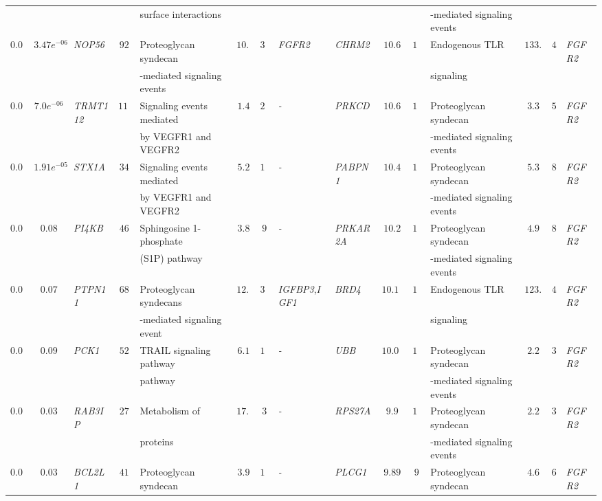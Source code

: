 \documentclass[10pt]{article}
\begin{document}
{\begin{landscape}
\begin{table}[!htbp]
{\begin{tabular}{c c l c l c c l |l c c l c c l}
&&&&  surface interactions &&&&&&& -mediated signaling events &&&\tabularnewline

$0.03$ & $3.47e^{-06}$ & \textit{NOP56} & $92$ & Proteoglycan syndecan & $10.1$ & $36$&\textit{FGFR2} & \textit{CHRM2} & $10.6$ & $12$ & Endogenous TLR  & $133.9$ & $4$ & \textit{FGFR2} \tabularnewline

&&&& -mediated signaling events &&&&&&& signaling &&&\tabularnewline

$0.07$ & $7.0e^{-06}$ & \textit{TRMT112} & $117$ & Signaling events mediated & $1.4$ & $20$&\textit{-} & \textit{PRKCD} & $10.6$ & $12$ & Proteoglycan syndecan & $3.3$ & $5$ & \textit{FGFR2} \tabularnewline

&&&& by VEGFR1 and VEGFR2 &&&&&&& -mediated signaling events &&&\tabularnewline

$0.09$ & $1.91e^{-05}$ & \textit{STX1A} & $34$ & Signaling events mediated & $5.2$ & $10$&\textit{-} & \textit{PABPN1} & $10.4$ & $13$ & Proteoglycan syndecan & $5.3$ & $8$ & \textit{FGFR2} \tabularnewline

&&&& by VEGFR1 and VEGFR2  &&&&&&& -mediated signaling events &&&\tabularnewline


$0.03$ & $0.08$ & \textit{PI4KB} & $46$ & Sphingosine 1-phosphate & $3.8$ & $9$&\textit{-} & \textit{PRKAR2A} & $10.2$ & $13$ & Proteoglycan syndecan & $4.9$ & $8$ & \textit{FGFR2} \tabularnewline

&&&&  (S1P) pathway &&&&&&& -mediated signaling events &&& \tabularnewline

$0.05$ & $0.07$ & \textit{PTPN11} & $68$ & Proteoglycan syndecans & $12.8$ & $38$&\textit{IGFBP3},\textit{IGF1} & \textit{BRD4} & $10.138$ & $12$ & Endogenous TLR  & $123.6$ & $4$ & \textit{FGFR2} \tabularnewline

&&&& -mediated signaling event &&&&&&& signaling &&& \tabularnewline

$0.04$ & $0.09$ & \textit{PCK1} & $52$ & TRAIL signaling pathway & $6.1$ & $17$&\textit{-} & \textit{UBB} & $10.04$ & $10$ & Proteoglycan syndecan & $2.2$ & $3$ & \textit{FGFR2} \tabularnewline

&&&&  pathway &&&&&&& -mediated signaling events &&& \tabularnewline
$0.04$ & $0.03$ & \textit{RAB3IP} & $27$ & Metabolism of  & $17.9$ & $3$&\textit{-} & \textit{RPS27A} & $9.9$ & $10$ & Proteoglycan syndecan & $2.2$ & $3$ & \textit{FGFR2} \tabularnewline

&&&& proteins &&&&&&& -mediated signaling events &&& \tabularnewline

$0.07$ & $0.03$ & \textit{BCL2L1} & $41$ & Proteoglycan syndecan & $3.9$ & $12$&\textit{-} & \textit{PLCG1} & $9.89$ & $9$ & Proteoglycan syndecan & $4.6$ & $6$ & \textit{FGFR2} \tabularnewline


\end{tabular}}
\end{table}
\end{landscape}}
\end{document}
